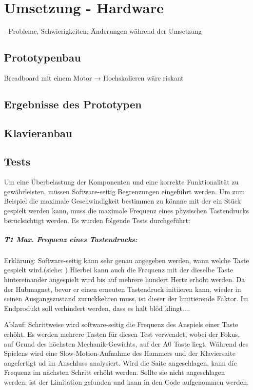 \chapter{Umsetzung - Hardware} \label{umsetzung}

\nocite{*}
- Probleme, Schwierigkeiten, Änderungen während der Umsetzung

\section{Prototypenbau}
Breadboard mit einem Motor → Hochskalieren wäre riskant
\section{Ergebnisse des Prototypen}
\section{Klavieranbau}
\section{Tests}

Um eine Überbelastung der Komponenten und eine korrekte Funktionalität zu gewährleisten, müssen Software-seitig Begrenzungen eingeführt werden.
Um zum Beispiel die maximale Geschwindigkeit bestimmen zu könnne mit der ein Stück gespielt werden kann, muss die maximale Frequenz eines physischen Tastendrucks berüclsichtigt werden.
Es wurden folgende Tests durchgeführt:

\paragraph{T1 Max. Frequenz eines Tastendrucks:}
Erklärung: Software-seitig kann sehr genau angegeben werden, wann welche Taste gespielt wird.(siehe: )
Hierbei kann auch die Frequenz mit der dieselbe Taste hintereinander angespielt wird bis auf mehrere hundert Hertz erhöht werden.
Da der Hubmagnet, bevor er einen erneuten Tastendruck initiieren kann, wieder in seinen Ausgangszustand zurückkehren muss, ist dieser der limitierende Faktor.
Im Endprodukt soll verhindert werden, dass es halt blöd klingt....

Ablauf: Schrittweise wird software-seitig die Frequenz des Anspiels einer Taste erhöht.
Es werden mehrere Tasten für diesen Test verwendet, wobei der Fokus, auf Grund des höchsten Mechanik-Gewichts, auf der A0 Taste liegt.
Während des Spielens wird eine Slow-Motion-Aufnahme des Hammers und der Klaviersaite angefertigt ud im Anschluss analysiert.
Wird die Saite angeschlagen, kann die Frequenz im nächsten Schritt erhöht werden.
Sollte sie nicht angeschlagen werden, ist der Limitation gefunden und kann in den Code aufgenommen werden.

